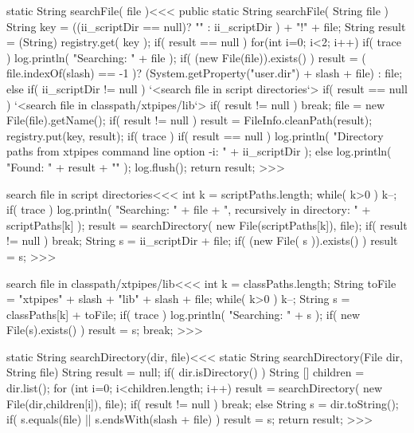 \documentclass{article}
\begin{document}
\<static String searchFile( file )\><<<
public static String searchFile( String file ){
   String key = ((ii_scriptDir == null)? "" : ii_scriptDir )
                + "!" + file;   
   String result = (String) registry.get( key );
   if( result == null ){
      for(int i=0; i<2; i++){
         if( trace ){ 
            log.println( "Searching: " + file );
         }
         if( (new File(file)).exists() ){ 
            result = ( file.indexOf(slash) == -1 )?
                         (System.getProperty("user.dir") + slash + file)
                        :
                         file; 
         }
         else {
            if( ii_scriptDir != null ){
               `<search file in script directories`> 
            }
            if( result == null ){ 
               `<search file in classpath/xtpipes/lib`> 
         }  }
         if( result != null ){ break; }
         file =  new File(file).getName();
      }
      if( result != null ){ 
        result = FileInfo.cleanPath(result);
        registry.put(key, result); 
      }  
   }  
   if( trace ){ 
      if( result == null ){
         log.println( 
            "Directory paths from xtpipes command line option -i: "
                                            + ii_scriptDir ); 
      } else { log.println( "Found: " + result + "\n" ); }
      log.flush();
   }
   return result; 
}  
>>>



\<search file in script directories\><<<
int k = scriptPaths.length;  
while( k>0 ){  
  k--;  
  if( trace ){
    log.println( "Searching: " + file 
                   + ", recursively in directory: " + scriptPaths[k] ); 
  } 
  result = searchDirectory( new File(scriptPaths[k]), file);  
  if( result != null ){ break; }
}
String s = ii_scriptDir + file;
if( (new File( s )).exists() ){ result = s; }
>>>


\<search file in classpath/xtpipes/lib\><<<
int k = classPaths.length; 
String toFile = "xtpipes" + slash + "lib" + slash + file;
while( k>0 ){ 
  k--; 
  String s =  classPaths[k] + toFile;
  if( trace ){ log.println( "Searching: " + s ); }
  if( new File(s).exists() ){ result = s; break; }
} 
>>>


\<static String searchDirectory(dir, file)\><<<
static String searchDirectory(File dir, String file) {
    String result = null;
    if( dir.isDirectory() ){
       String [] children = dir.list();
       for (int i=0; i<children.length; i++) {
          result = searchDirectory( new File(dir,children[i]), file);
          if( result != null ) { break; }
       }
    } else {
       String s = dir.toString();
       if( s.equals(file) || s.endsWith(slash + file) ){
           result = s;
        } 
     }
     return result;
}
>>>
\end{document}
